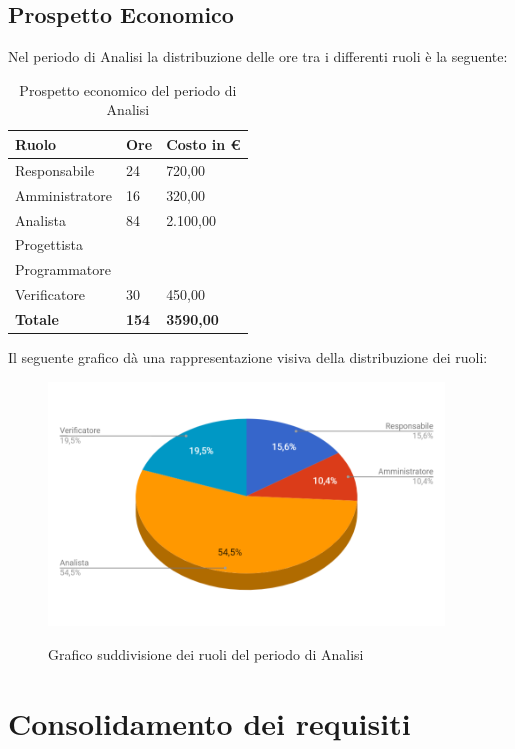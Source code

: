\documentclass[PianoDiProgetto.tex]{subfiles}
\begin{document}
\subsection{Prospetto Economico}
Nel periodo di Analisi la distribuzione delle ore tra i differenti ruoli è la seguente:\\
\begin{table}[htbp]
	\centering
	\renewcommand\arraystretch{1.5}
	\begin{tabularx}{\textwidth}{p{5cm}|p{4cm}|p{4cm}}
		\hline
		\textbf{Ruolo} & \textbf{Ore} & \textbf{Costo in \euro} \\
		\hline
		Responsabile & 24 & 720,00 \\
		\hline
		Amministratore & 16 & 320,00 \\
		\hline
		Analista & 84 & 2.100,00 \\
		\hline
		Progettista & \ & \ \\
		\hline
		Programmatore & \ & \ \\
		\hline
		Verificatore & 30 & 450,00 \\
		\hline
		\textbf{Totale} & \textbf{154} & \textbf{3590,00}\\
		\hline
	\end{tabularx}
	\caption{Prospetto economico del periodo di Analisi}
	\label{my-label}
\end{table} \newpage
Il seguente grafico dà una rappresentazione visiva della distribuzione dei ruoli:
\begin{figure}[h]
	\centering
	\includegraphics[width=10.5cm]{images/prospettoEconomico/analisi.png}
	\label{fig:foo}
	\caption{Grafico suddivisione dei ruoli del periodo di Analisi}
\end{figure} 
\section{Consolidamento dei requisiti}
\end{document}
